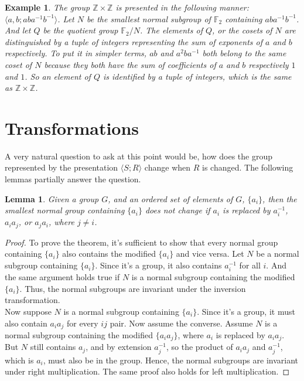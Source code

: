 \documentclass[12pt, titlepage]{article}
\newtheorem{lem}[thm]{Lemma}
\newtheorem{exmp}[thm]{Example}
\theoremstyle{definition}
\begin{document}
\begin{exmp}
The group $\mathbb{Z} \times \mathbb{Z}$ is presented in the following manner: $\langle a,b;aba^{-1}b^{-1}\rangle$. Let $N$ be the smallest normal subgroup of $\mathbb{F}_2$ containing $aba^{-1}b^{-1}$. And let $Q$ be the quotient group $\mathbb{F}_2/N$. The elements of $Q$, or the cosets of $N$ are distinguished by a tuple of integers representing the sum of exponents of $a$ and $b$ respectively. To put it in simpler terms, $ab$ and $a^2ba^{-1}$ both belong to the same coset of $N$ because they both have the sum of coefficients of $a$ and $b$ respectively $1$ and $1$. So an element of $Q$ is identified by a tuple of integers, which is the same as $\mathbb{Z} \times \mathbb{Z}$.
\end{exmp}

\section{Transformations}

A very natural question to ask at this point would be, how does the group represented by the presentation $\langle S;R \rangle$ change when $R$ is changed. The following lemmas partially answer the question. 

\begin{lem}\label{elementary}
Given a group $G$, and an ordered set of elements of $G$, $\{a_i\}$, then the smallest normal group containing $\{a_i\}$ does not change if $a_i$ is replaced by $a_i^{-1}$, $a_i a_j$, or $a_j a_i$, where $j \neq i$.
\end{lem}

\begin{proof}
To prove the theorem, it's sufficient to show that every normal group containing $\{a_i\}$ also contains the modified $\{a_i\}$ and vice versa. Let $N$ be a normal subgroup containing $\{a_i\}$. Since it's a group, it also contains $a_i^{-1}$ for all $i$. And the same argument holds true if $N$ is a normal subgroup containing the modified $\{a_i\}$. Thus, the normal subgroups are invariant under the inversion transformation.\\
Now suppose $N$ is a normal subgroup containing $\{a_i\}$. Since it's a group, it must also contain $a_ia_j$ for every $ij$ pair. Now assume the converse. Assume $N$ is a normal subgroup containing the modified $\{a_ia_j\}$, where $a_i$ is replaced by $a_ia_j$. But $N$ still contains $a_j$, and by extension $a_j^{-1}$, so the product of $a_ia_j$ and $a_j^{-1}$, which is $a_i$, must also be in the group. Hence, the normal subgroups are invariant under right multiplication. The same proof also holds for left multiplication.
\end{proof}
\end{document}
